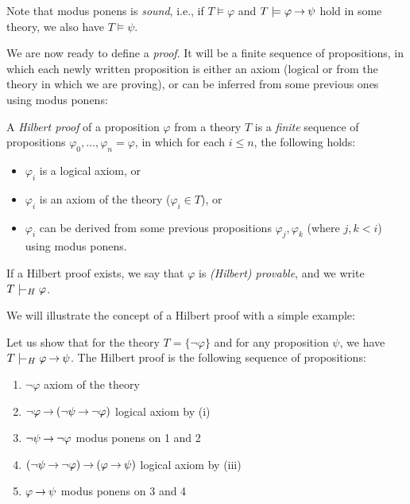 Note that modus ponens is \emph{sound}, i.e., if $T \models \varphi$ and $T \models \varphi \mathbin{\rightarrow} \psi$ hold in some theory, we also have $T \models \psi$.

We are now ready to define a \emph{proof}. It will be a finite sequence of propositions, in which each newly written proposition is either an axiom (logical or from the theory in which we are proving), or can be inferred from some previous ones using modus ponens:

\begin{definition}
    A \emph{Hilbert proof} of a proposition $\varphi$ from a theory $T$ is a \emph{finite} sequence of propositions $\varphi_0, \dots, \varphi_n = \varphi$, in which for each $i \leq n$, the following holds:
    \begin{itemize}
    \item $\varphi_i$ is a logical axiom, or
    \item $\varphi_i$ is an axiom of the theory ($\varphi_i \in T$), or
    \item $\varphi_i$ can be derived from some previous propositions $\varphi_j, \varphi_k$ (where $j, k < i$) using modus ponens.
    \end{itemize}
    If a Hilbert proof exists, we say that $\varphi$ is \emph{(Hilbert) provable}, and we write $T \proves_H \varphi$.           
\end{definition}

We will illustrate the concept of a Hilbert proof with a simple example:

\begin{example}
Let us show that for the theory $T = \{\neg \varphi\}$ and for any proposition $\psi$, we have $T \proves_H \varphi \limplies \psi$. The Hilbert proof is the following sequence of propositions:
\begin{enumerate}\it
    \item $\neg \varphi$ \hfill axiom of the theory
    \item $\neg \varphi \mathbin{\rightarrow} (\neg \psi \mathbin{\rightarrow} \neg \varphi)$ \hfill logical axiom by (i)
    \item $\neg \psi \mathbin{\rightarrow} \neg \varphi$ \hfill modus ponens on 1 and 2
    \item $(\neg \psi \mathbin{\rightarrow} \neg \varphi) \mathbin{\rightarrow} (\varphi \mathbin{\rightarrow} \psi)$ \hfill logical axiom by (iii)
    \item $\varphi \mathbin{\rightarrow} \psi$ \hfill modus ponens on 3 and 4 
\end{enumerate}
\end{example}

